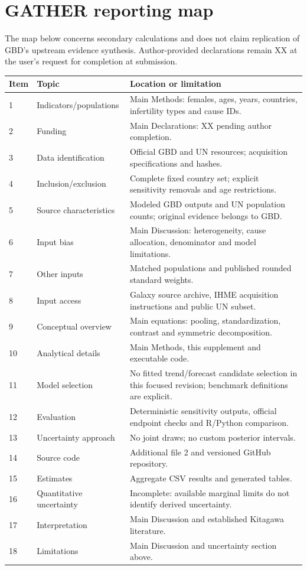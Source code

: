 \documentclass[11pt,a4paper]{article}
\begin{document}
\section{GATHER reporting map}
The map below concerns secondary calculations and does not claim replication of GBD's upstream evidence synthesis. Author-provided declarations remain XX at the user's request for completion at submission.
\small
\begin{longtable}{p{}p{}p{}}
\toprule Item & Topic & Location or limitation\\\midrule\endhead
1 & Indicators/populations & Main Methods: females, ages, years, countries, infertility types and cause IDs.\\
2 & Funding & Main Declarations: XX pending author completion.\\
3 & Data identification & Official GBD and UN resources; acquisition specifications and hashes.\\
4 & Inclusion/exclusion & Complete fixed country set; explicit sensitivity removals and age restrictions.\\
5 & Source characteristics & Modeled GBD outputs and UN population counts; original evidence belongs to GBD.\\
6 & Input bias & Main Discussion: heterogeneity, cause allocation, denominator and model limitations.\\
7 & Other inputs & Matched populations and published rounded standard weights.\\
8 & Input access & Galaxy source archive, IHME acquisition instructions and public UN subset.\\
9 & Conceptual overview & Main equations: pooling, standardization, contrast and symmetric decomposition.\\
10 & Analytical details & Main Methods, this supplement and executable code.\\
11 & Model selection & No fitted trend/forecast candidate selection in this focused revision; benchmark definitions are explicit.\\
12 & Evaluation & Deterministic sensitivity outputs, official endpoint checks and R/Python comparison.\\
13 & Uncertainty approach & No joint draws; no custom posterior intervals.\\
14 & Source code & Additional file 2 and versioned GitHub repository.\\
15 & Estimates & Aggregate CSV results and generated tables.\\
16 & Quantitative uncertainty & Incomplete: available marginal limits do not identify derived uncertainty.\\
17 & Interpretation & Main Discussion and established Kitagawa literature.\\
18 & Limitations & Main Discussion and uncertainty section above.\\\bottomrule
\end{longtable}\normalsize
\end{document}
